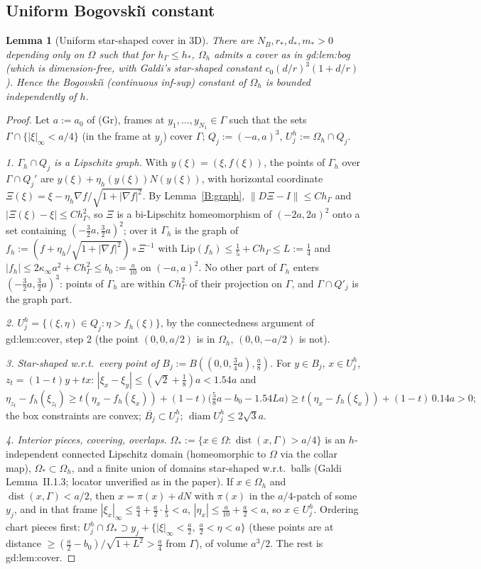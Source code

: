 \documentclass[11pt]{article}
\newtheorem{lemma}[theorem]{Lemma}
\theoremstyle{definition}
\newcommand{\hG}{h_\Gamma}
\newcommand{\Gh}{\Gamma_h}
\newcommand{\Oh}{\Omega_h}
\newcommand{\norm}[1]{\lVert #1\rVert}
\DeclareMathOperator{\diam}{diam}
\DeclareMathOperator{\dist}{dist}
\begin{document}
\subsection{Uniform Bogovski\u{\i} constant}
\begin{lemma}[Uniform star-shaped cover in 3D]\label{B:cover}
There are $N_B,r_\ast,d_\ast,m_\ast>0$ depending only on $\Omega$ such that for $\hG\le h_\ast$, $\Oh$ admits a cover as in gd:lem:bog (which is dimension-free, with Galdi's star-shaped constant $c_0(d/r)^3(1+d/r)$). Hence the Bogovski\u{\i} (continuous inf-sup) constant of $\Oh$ is bounded independently of $h$.
\end{lemma}
\begin{proof}
Let $a:=a_0$ of (Gr), frames at $y_1,\dots,y_{N_1}\in\Gamma$ such that the sets $\Gamma\cap\{|\xi|_\infty<a/4\}$ (in the frame at $y_j$) cover $\Gamma$; $Q_j:=(-a,a)^3$, $U_j^h:=\Oh\cap Q_j$.

\emph{1. $\Gh\cap Q_j$ is a Lipschitz graph.} With $y(\xi)=(\xi,f(\xi))$, the points of $\Gh$ over $\Gamma\cap Q_j'$ are $y(\xi)+\eta_h(y(\xi))N(y(\xi))$, with horizontal coordinate $\Xi(\xi)=\xi-\eta_h\nabla f/\sqrt{1+|\nabla f|^2}$. By Lemma~\ref{B:graph}, $\norm{D\Xi-I}\le C\hG$ and $|\Xi(\xi)-\xi|\le C\hG^2$, so $\Xi$ is a bi-Lipschitz homeomorphism of $(-2a,2a)^2$ onto a set containing $(-\frac32a,\frac32a)^2$; over it $\Gh$ is the graph of $f_h:=(f+\eta_h/\sqrt{1+|\nabla f|^2})\circ\Xi^{-1}$ with $\mathrm{Lip}(f_h)\le\frac15+C\hG\le L:=\frac14$ and $|f_h|\le2\kappa_\infty a^2+C\hG^2\le b_0:=\frac a{10}$ on $(-a,a)^2$. No other part of $\Gh$ enters $(-\frac32a,\frac32a)^3$: points of $\Gh$ are within $C\hG^2$ of their projection on $\Gamma$, and $\Gamma\cap Q'_j$ is the graph part.

\emph{2. $U^h_j=\{(\xi,\eta)\in Q_j:\eta>f_h(\xi)\}$}, by the connectedness argument of gd:lem:cover, step 2 (the point $(0,0,a/2)$ is in $\Oh$, $(0,0,-a/2)$ is not).

\emph{3. Star-shaped w.r.t.\ every point of $B_j:=B((0,0,\frac34a),\frac a8)$.} For $y\in B_j$, $x\in U_j^h$, $z_t=(1-t)y+tx$: $|\xi_x-\xi_y|\le(\sqrt2+\frac18)a<1.54a$ and
\[
\eta_{z_t}-f_h(\xi_{z_t})\ge t(\eta_x-f_h(\xi_x))+(1-t)\bigl(\tfrac58a-b_0-1.54La\bigr)\ge t(\eta_x-f_h(\xi_x))+(1-t)\,0.14a>0;
\]
the box constraints are convex; $\overline{B_j}\subset U^h_j$; $\diam U_j^h\le2\sqrt3a$.

\emph{4. Interior pieces, covering, overlaps.} $\Omega_\ast:=\{x\in\Omega:\dist(x,\Gamma)>a/4\}$ is an $h$-independent connected Lipschitz domain (homeomorphic to $\Omega$ via the collar map), $\Omega_\ast\subset\Oh$, and a finite union of domains star-shaped w.r.t.\ balls (Galdi Lemma~II.1.3; locator unverified as in the paper). If $x\in\Oh$ and $\dist(x,\Gamma)<a/2$, then $x=\pi(x)+dN$ with $\pi(x)$ in the $a/4$-patch of some $y_j$, and in that frame $|\xi_x|_\infty\le\frac a4+\frac a2\cdot\frac15<a$, $|\eta_x|\le\frac a{10}+\frac a2<a$, so $x\in U^h_j$. Ordering chart pieces first: $U^h_j\cap\Omega_\ast\supset y_j+\{|\xi|_\infty<\frac a2,\ \frac a2<\eta<a\}$ (these points are at distance $\ge(\frac a2-b_0)/\sqrt{1+L^2}>\frac a4$ from $\Gamma$), of volume $a^3/2$. The rest is gd:lem:cover.
\end{proof}
\end{document}
